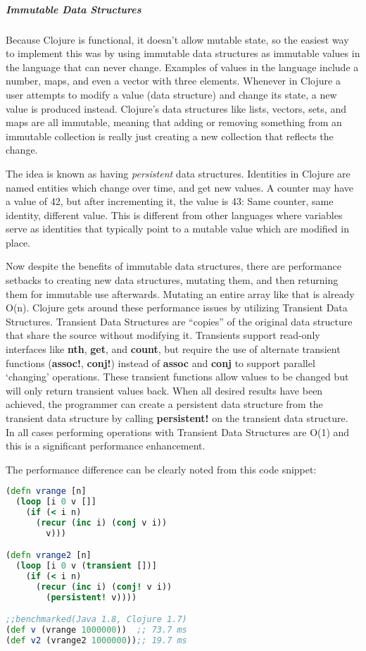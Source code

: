     \subparagraph{Immutable Data Structures}
    
    
    Because Clojure is functional, it doesn't allow mutable state, so the easiest way to implement this was by using immutable data structures as immutable values in the language that can never change. Examples of values in the language include a number, maps, and even a vector with three elements. Whenever in Clojure a user attempts to modify a value (data structure) and change its state, a new value is produced instead. Clojure's data structures like lists, vectors, sets, and maps are all immutable, meaning that adding or removing something from an immutable collection is really just creating a new collection that reflects the change.  
    
    The idea is known as having \textit{persistent} data structures. Identities in Clojure are named entities which change over time, and get new values. A counter may have a value of 42, but after incrementing it, the value is 43: Same counter, same identity, different value. This is different from other languages where variables serve as identities that typically point to a mutable value which are modified in place. \cite{clojure_website:reference}
    
    Now despite the benefits of immutable data structures, there are performance setbacks to creating new data structures, mutating them, and then returning them for immutable use afterwards. Mutating an entire array like that is already O(n). Clojure gets around these performance issues by utilizing Transient Data Structures. Transient Data Structures are ``copies'' of the original data structure that share the source without modifying it. Transients support read-only interfaces like \textbf{nth}, \textbf{get}, and \textbf{count}, but require the use of alternate transient functions (\textbf{assoc!}, \textbf{conj!}) instead of \textbf{assoc} and \textbf{conj} to support parallel `changing' operations. These transient functions allow values to be changed but will only return transient values back. When all desired results have been achieved, the programmer can create a persistent data structure from the transient data structure by calling \textbf{persistent!} on the transient data structure. In all cases performing operations with Transient Data Structures are O(1) and this is a significant performance enhancement.

    The performance difference can be clearly noted from this code snippet:
    
    \begin{lstlisting}[language=clojure]
(defn vrange [n]
  (loop [i 0 v []]
    (if (< i n)
	  (recur (inc i) (conj v i))
	    v)))

(defn vrange2 [n]
  (loop [i 0 v (transient [])]
    (if (< i n)
	  (recur (inc i) (conj! v i))
	    (persistent! v))))

;;benchmarked(Java 1.8, Clojure 1.7)
(def v (vrange 1000000))  ;; 73.7 ms
(def v2 (vrange2 1000000));; 19.7 ms
	\end{lstlisting}
    
